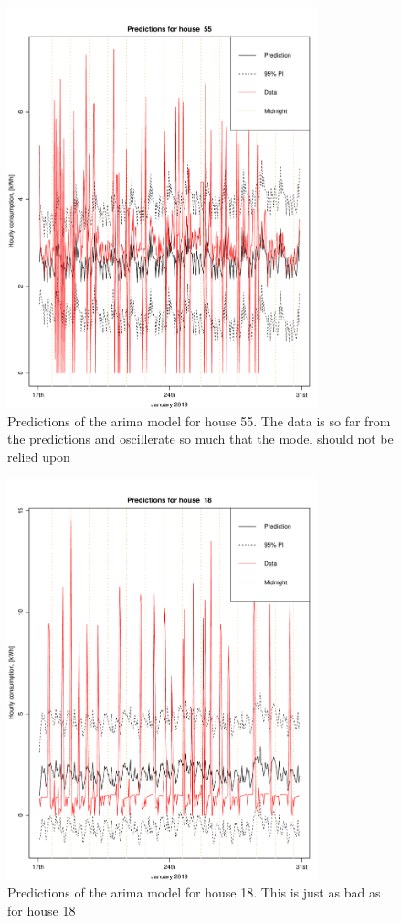 \begin{figure}
    \centering
    \includegraphics[width=0.8\textwidth]{../../../figures/arimax/arima1_pred_55.pdf}
    \caption{Predictions of the arima model for house 55. The data is so far from the predictions and oscillerate so much that the model should not be relied upon}
    \label{fig:arima1_pred_55}
\end{figure}

\begin{figure}
    \centering
    \includegraphics[width=0.8\textwidth]{../../../figures/arimax/arima1_pred_18.pdf}
    \caption{Predictions of the arima model for house 18. This is just as bad as for house 18}
    \label{fig:arima1_pred_18}
\end{figure}




